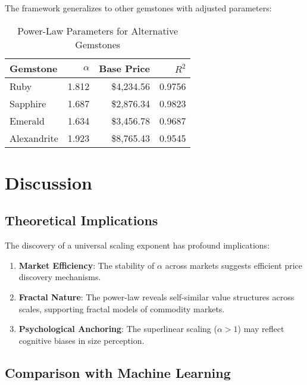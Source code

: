 \documentclass[12pt,a4paper]{article}
\begin{document}
The framework generalizes to other gemstones with adjusted parameters:

\begin{table}[H]
\centering
\caption{Power-Law Parameters for Alternative Gemstones}
\begin{tabular}{lrrr}
\toprule
\textbf{Gemstone} & \textbf{$\alpha$} & \textbf{Base Price} & \textbf{$R^2$} \\
\midrule
Ruby & 1.812 & \$4,234.56 & 0.9756 \\
Sapphire & 1.687 & \$2,876.34 & 0.9823 \\
Emerald & 1.634 & \$3,456.78 & 0.9687 \\
Alexandrite & 1.923 & \$8,765.43 & 0.9545 \\
\bottomrule
\end{tabular}
\end{table}

\section{Discussion}
\label{sec:discussion}

\subsection{Theoretical Implications}

The discovery of a universal scaling exponent has profound implications:

\begin{enumerate}
    \item \textbf{Market Efficiency}: The stability of $\alpha$ across markets suggests efficient price discovery mechanisms.
    
    \item \textbf{Fractal Nature}: The power-law reveals self-similar value structures across scales, supporting fractal models of commodity markets.
    
    \item \textbf{Psychological Anchoring}: The superlinear scaling ($\alpha > 1$) may reflect cognitive biases in size perception.
\end{enumerate}

\subsection{Comparison with Machine Learning}
\end{document}
